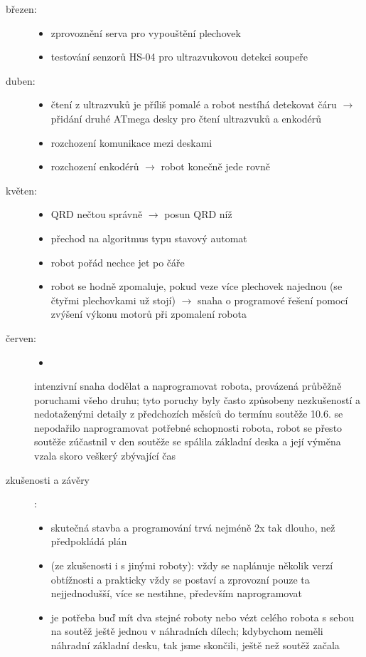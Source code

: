 \begin{description}
	\item[březen:] 
	\begin{itemize}
		\item zprovoznění serva pro vypouštění plechovek
		\item testování senzorů HS-04 pro ultrazvukovou detekci soupeře 
	\end{itemize}  
	
	\item[duben:] 
	\begin{itemize}
		\item čtení z ultrazvuků je příliš pomalé a robot nestíhá detekovat čáru $\rightarrow$
		přidání druhé ATmega desky pro čtení ultrazvuků a enkodérů
		\item rozchození komunikace mezi deskami 
		\item rozchození enkodérů $\rightarrow$ robot konečně jede rovně 
	\end{itemize}  
	
	\item[květen:] 
	\begin{itemize}
		\item QRD nečtou správně $\rightarrow$ posun QRD níž
		\item přechod na algoritmus typu stavový automat
		\item robot pořád nechce jet po čáře
		\item robot  se hodně zpomaluje, pokud veze více plechovek najednou (se čtyřmi plechovkami už stojí) $\rightarrow$ snaha o programové řešení pomocí zvýšení výkonu motorů při zpomalení robota
	\end{itemize}
	
	
	\item[červen:] 
	\begin{itemize}
		\item 
	\end{itemize} intenzivní snaha dodělat a naprogramovat robota, provázená průběžně poruchami všeho druhu;
	tyto poruchy byly často způsobeny nezkušeností a nedotaženými detaily z předchozích měsíců  
	do termínu soutěže 10.6. se nepodařilo naprogramovat potřebné schopnosti robota, robot se přesto soutěže zúčastnil
	v den soutěže se spálila základní deska a její výměna vzala skoro veškerý zbývající čas 
	
	\item[zkušenosti a závěry]:
	\begin{itemize}
		\item  skutečná stavba a programování trvá nejméně 2x tak dlouho, než předpokládá plán 
		\item (ze zkušenosti i s jinými roboty): vždy se naplánuje několik verzí obtížnosti a prakticky vždy se postaví a zprovozní pouze ta nejjednodušší, více se nestihne, především naprogramovat  
		\item je potřeba buď mít dva stejné roboty nebo vézt celého robota s sebou na soutěž ještě jednou v náhradních dílech; kdybychom neměli náhradní základní desku, tak jsme skončili, ještě než soutěž začala  
	\end{itemize}
	
\end{description}

